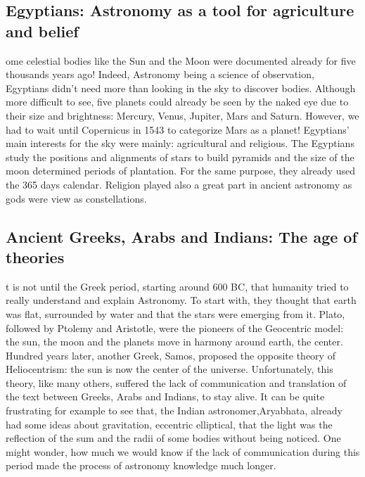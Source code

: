\subsection*{Egyptians: Astronomy as a tool for agriculture and belief}
ome celestial bodies like the Sun and the Moon were documented already for five thousands years ago!
Indeed, Astronomy being a science of observation, Egyptians didn't need more than looking in the sky to discover bodies.
Although more difficult to see, five planets could already be seen by the naked eye due to their size and brightness:
Mercury, Venus, Jupiter, Mars and Saturn.
However, we had to wait until Copernicus in 1543 to categorize Mars as a planet!
Egyptians' main interests for the sky were mainly: agricultural and religious.
The Egyptians study the positions and alignments of stars to build pyramids and the size of the moon determined periods of plantation.
For the same purpose, they already used the 365 days calendar.
Religion played also a great part in ancient astronomy as gods were view as constellations.

\subsection*{Ancient Greeks, Arabs and Indians: The age of theories}
t is not until the Greek period, starting around 600 BC, that humanity tried to really understand and explain Astronomy.
To start with, they thought that earth was flat, surrounded by water and that the stars were emerging from it.
Plato, followed by Ptolemy and Aristotle, were the pioneers of the Geocentric model: the sun, the moon and the planets move in harmony around earth, the center.
Hundred years later, another Greek, Samos, proposed the opposite theory of Heliocentrism: the sun is now the center of the universe.
Unfortunately, this theory, like many others, suffered the lack of communication and translation of the text between Greeks, Arabs and Indians, to stay alive.
It can be quite frustrating for example to see that, the Indian astronomer,Aryabhata, already had some ideas about gravitation, eccentric elliptical, that the light was the reflection of the sum and the radii of some bodies without being noticed.
One might wonder, how much we would know if the lack of communication during this period made the process of astronomy knowledge much longer.

